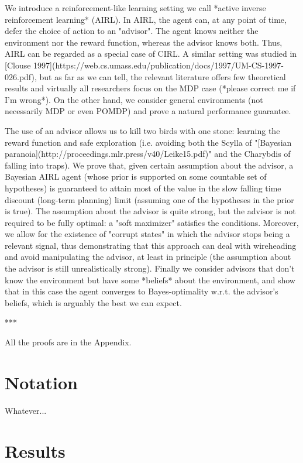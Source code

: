 \documentclass[a4paper]{article}
\begin{document}
We introduce a reinforcement-like learning setting we call *active inverse reinforcement learning* (AIRL). In AIRL, the agent can, at any point of time, defer the choice of action to an "advisor". The agent knows neither the environment nor the reward function, whereas the advisor knows both. Thus, AIRL can be regarded as a special case of CIRL. A similar setting was studied in [Clouse 1997](https://web.cs.umass.edu/publication/docs/1997/UM-CS-1997-026.pdf), but as far as we can tell, the relevant literature offers few theoretical results and virtually all researchers focus on the MDP case (*please correct me if I'm wrong*). On the other hand, we consider general environments (not necessarily MDP or even POMDP) and prove a natural performance guarantee.

The use of an advisor allows us to kill two birds with one stone: learning the reward function and safe exploration (i.e. avoiding both the Scylla of "[Bayesian paranoia](http://proceedings.mlr.press/v40/Leike15.pdf)" and the Charybdis of falling into traps). We prove that, given certain assumption about the advisor, a Bayesian AIRL agent (whose prior is supported on some countable set of hypotheses) is guaranteed to attain most of the value in the slow falling time discount (long-term planning) limit (assuming one of the hypotheses in the prior is true). The assumption about the advisor is quite strong, but the advisor is not required to be fully optimal: a "soft maximizer" satisfies the conditions. Moreover, we allow for the existence of "corrupt states" in which the advisor stops being a relevant signal, thus demonstrating that this approach can deal with wireheading and avoid manipulating the advisor, at least in principle (the assumption about the advisor is still unrealistically strong). Finally we consider advisors that don't know the environment but have some *beliefs* about the environment, and show that in this case the agent converges to Bayes-optimality w.r.t. the advisor's beliefs, which is arguably the best we can expect.

***

All the proofs are in the Appendix.

\section{Notation}

Whatever...

\section{Results}
\end{document}
